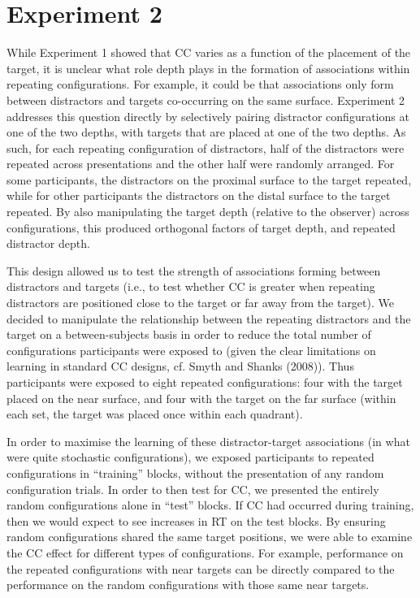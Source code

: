 \documentclass[
  english,
  man,floatsintext]{apa7}
\begin{document}
\hypertarget{experiment-2}{%
\section{Experiment 2}\label{experiment-2}}

While Experiment 1 showed that CC varies as a function of the placement of the target, it is unclear what role depth plays in the formation of associations within repeating configurations. For example, it could be that associations only form between distractors and targets co-occurring on the same surface. Experiment 2 addresses this question directly by selectively pairing distractor configurations at one of the two depths, with targets that are placed at one of the two depths. As such, for each repeating configuration of distractors, half of the distractors were repeated across presentations and the other half were randomly arranged. For some participants, the distractors on the proximal surface to the target repeated, while for other participants the distractors on the distal surface to the target repeated. By also manipulating the target depth (relative to the observer) across configurations, this produced orthogonal factors of target depth, and repeated distractor depth.

This design allowed us to test the strength of associations forming between distractors and targets (i.e., to test whether CC is greater when repeating distractors are positioned close to the target or far away from the target). We decided to manipulate the relationship between the repeating distractors and the target on a between-subjects basis in order to reduce the total number of configurations participants were exposed to (given the clear limitations on learning in standard CC designs, cf. Smyth and Shanks (2008)). Thus participants were exposed to eight repeated configurations: four with the target placed on the near surface, and four with the target on the far surface (within each set, the target was placed once within each quadrant).

In order to maximise the learning of these distractor-target associations (in what were quite stochastic configurations), we exposed participants to repeated configurations in ``training'' blocks, without the presentation of any random configuration trials. In order to then test for CC, we presented the entirely random configurations alone in ``test'' blocks. If CC had occurred during training, then we would expect to see increases in RT on the test blocks. By ensuring random configurations shared the same target positions, we were able to examine the CC effect for different types of configurations. For example, performance on the repeated configurations with near targets can be directly compared to the performance on the random configurations with those same near targets.
\end{document}
